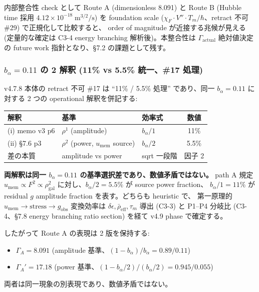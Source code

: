 \documentclass[11pt,a4paper]{ltjsarticle}
\newcommand{\Tm}{T_{m}}
\newcommand{\taum}{\tau_{m}}
\newcommand{\bal}{b_{\alpha}}
\newcommand{\umem}{u_{\mathrm{mem}}}
\newcommand{\rhogal}{\rho_{\mathrm{gal}}}
\newcommand{\GammaA}{\Gamma_{A}}
\newcommand{\GammaAp}{\Gamma_{A}'}
\newcommand{\Gammaact}{\Gamma_{\mathrm{actual}}}
\newcommand{\gobs}{g_{\mathrm{obs}}}
\begin{document}
内部整合性 check として Route A (dimensionless 8.091) と Route B (Hubble time 採用
$4.12 \times 10^{-18}\;\mathrm{m}^{3/2}/\mathrm{s}$) を foundation scale
($\chi_F \cdot V'' \cdot \Tm / \hbar$、retract 不可 \#29) で正規化して比較すると、
order of magnitude が近接する兆候が見える (定量的な確定は C3-4 energy branching 解析後)。本整合性は
$\Gammaact$ 絶対値決定の future work 指針となり、\S 7.2 の課題として残す。

\subsubsection{\texorpdfstring{$\bal = 0.11$ の 2 解釈 (11\% vs 5.5\% 統一、\#17 処理)}{b\_alpha = 0.11 の 2 解釈}}
v4.7.8 本体の retract 不可 \#17 は ``11\% / 5.5\% 処理'' であり、同一 $\bal = 0.11$ に対する
2 つの operational 解釈を併記する:

\begin{center}\small
\begin{tabular}{@{}lllc@{}}
\toprule
解釈 & 基準 & 効率式 & 数値 \\
\midrule
(i) memo v3 p6 & $\rho^{1}$ (amplitude) & $\bal / 1$ & 11\% \\
(ii) \S 7.6 p3 & $\rho^{2}$ (power, $\umem$ source) & $\bal / 2$ & 5.5\% \\
\midrule
差の本質 & amplitude vs power & sqrt 一段階 & 因子 2 \\
\bottomrule
\end{tabular}
\end{center}

\begin{notebox}
\textbf{両解釈は同一 $\bal = 0.11$ の基準選択差であり、数値矛盾ではない。}
path A 規定 $\umem \propto F^2 \propto \rhogal^2$ に対し、$\bal/2 = 5.5\%$ が source power fraction、
$\bal/1 = 11\%$ が residual $g$ amplitude fraction を表す。どちらも heuristic で、
第一原理的 $\umem \to \text{stress} \to \gobs$ 変換効率は $\delta\epsilon, \bar{\rho}_{\mathrm{eff}}, \taum$ 導出 (C3-3) と
P1--P4 分岐比 (C3-4、\S 7.8 energy branching ratio section) を経て v4.9 phase で確定する。
\end{notebox}

したがって Route A の表現は 2 版を保持する:
\begin{itemize}[leftmargin=*,itemsep=2pt]
\item $\GammaA = 8.091$ (amplitude 基準、$(1 - \bal)/\bal = 0.89/0.11$)
\item $\GammaAp = 17.18$ (power 基準、$(1 - \bal/2)/(\bal/2) = 0.945/0.055$)
\end{itemize}
両者は同一現象の別表現であり、数値矛盾ではない。
\end{document}
